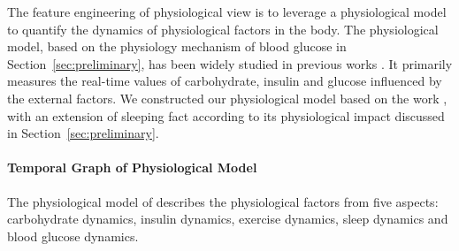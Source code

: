 The feature engineering of physiological view is to leverage a physiological model to quantify the dynamics of physiological factors in the body. 
The physiological model, based on the physiology mechanism of blood glucose in Section~\ref{sec:preliminary}, has been widely studied in previous works \cite{bib:briegel2002nonlinear,bib:duke2010intelligent, bib:plis2014machine}.
It primarily measures the real-time values of carbohydrate, insulin and glucose influenced by the external factors. 
We constructed our physiological model based on the work \cite{bib:duke2010intelligent}, with an extension of sleeping fact according to its physiological impact discussed in Section~\ref{sec:preliminary}.

\paragraph{Temporal Graph of Physiological Model}
The physiological model of \sysname describes the physiological factors from five aspects: carbohydrate dynamics, insulin dynamics, exercise dynamics, sleep dynamics and blood glucose dynamics.



